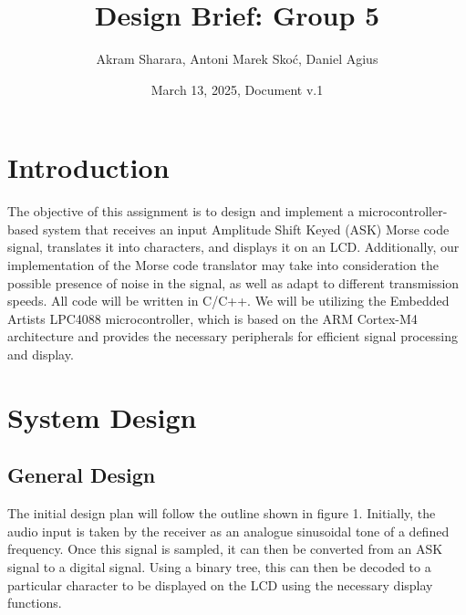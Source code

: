 \documentclass{cce2014-design}
\title{Design Brief: Group 5}
\author{
   Akram Sharara,
   Antoni Marek Skoć,
   Daniel Agius}
\date{March 13, 2025, Document v.1}
\begin{document}
\maketitle


\section{Introduction}
The objective of this assignment is to design and implement a microcontroller-based system that receives an input Amplitude Shift Keyed (ASK) Morse code signal, translates it into characters, and displays it on an LCD. Additionally, our implementation of the Morse code translator may take into consideration the possible presence of noise in the signal, as well as adapt to different transmission speeds. All code will be written in C/C++. We will be utilizing the Embedded Artists LPC4088 microcontroller, which is based on the ARM Cortex-M4 architecture and provides the necessary peripherals for efficient signal processing and display.

\section{System Design}
\subsection{General Design}
The initial design plan will follow the outline shown in figure 1. Initially, the audio input is taken by the receiver as an analogue sinusoidal tone of a defined frequency. Once this signal is sampled, it can then be converted from an ASK signal to a digital signal. Using a binary tree, this can then be decoded to a particular character to be displayed on the LCD using the necessary display functions.
\end{document}
